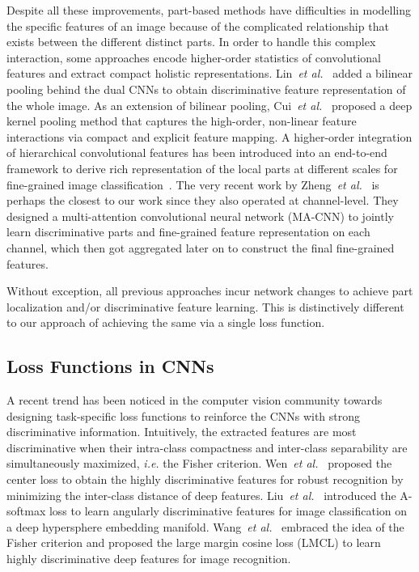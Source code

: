 \documentclass[journal]{IEEEtran}
\begin{document}
Despite all these improvements, part-based methods have difficulties in modelling the specific features of an image because of the complicated relationship that exists between the different distinct parts. In order to handle this complex interaction, some approaches encode higher-order statistics of convolutional features and extract compact holistic representations.  Lin~\emph{et al.}~\cite{lin2015bilinear} added a bilinear pooling behind the dual CNNs to obtain discriminative feature representation of the whole image. As an extension of bilinear pooling, Cui~\emph{et al.}~\cite{cui2017kernel} proposed a deep kernel pooling method that captures the high-order, non-linear feature interactions via compact and explicit feature mapping. A higher-order integration of hierarchical convolutional features has been introduced into an end-to-end framework to derive rich representation of the local parts at different scales for fine-grained image classification~\cite{cai2017higher}.
The very recent work by Zheng~\emph{et al.}~\cite{zheng2017learning} is perhaps the closest to our work since they also operated at channel-level. They designed a multi-attention convolutional neural network (MA-CNN) to jointly learn discriminative parts and fine-grained feature representation on each channel, which then got aggregated later on to construct the final fine-grained features. 

Without exception, all previous approaches incur network changes to achieve part localization and/or discriminative feature learning. This is distinctively different to our approach of achieving the same via a single loss function. 



\subsection{Loss Functions in CNNs}

A recent trend has been noticed in the computer vision community towards designing task-specific loss functions to reinforce the CNNs with strong discriminative information. Intuitively, the extracted features are most discriminative when their intra-class compactness and inter-class separability are simultaneously maximized, \emph{i.e.} the Fisher criterion. Wen~\emph{et al.}~\cite{wen2016discriminative} proposed the center loss to obtain the highly discriminative features for robust recognition by minimizing the inter-class distance of deep features. Liu~\emph{et al.}~\cite{liu2017sphereface} introduced the A-softmax loss to learn angularly discriminative features for image classification on a deep hypersphere embedding manifold. Wang~\emph{et al.}~\cite{wang2018cosface} embraced the idea of the Fisher criterion and proposed the large margin cosine loss (LMCL) to learn highly discriminative deep features for image recognition.
\end{document}
